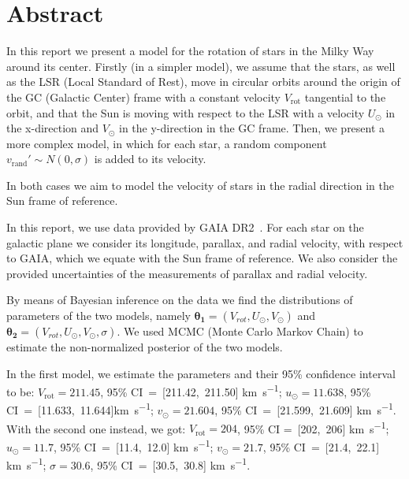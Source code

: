 \section*{Abstract}

In this report we present a model for the rotation of stars in the Milky Way around its center.
Firstly (in a simpler model), we assume that the stars, as well as the LSR (Local Standard of Rest), 
move in circular orbits around the origin of the GC (Galactic Center) frame 
with a constant velocity $V_{\text{rot}}$ tangential to the orbit,
and that the Sun is moving with respect to the LSR 
with a velocity $U_{\odot}$ in the x-direction and $V_{\odot}$ in the y-direction in the GC frame. 
Then, we present a more complex model, in which for each star, 
a random component $v_{\text{rand}}' \sim N(0, \sigma)$ is added to its velocity.


In both cases we aim to model the velocity of stars in the radial direction 
in the Sun frame of reference.

In this report, we use data provided by GAIA DR2~\cite{GAIADR2}.
For each star on the galactic plane we consider its longitude, parallax, and radial velocity,
with respect to GAIA, which we equate with the Sun frame of reference.
We also consider the provided uncertainties of the measurements of parallax and radial velocity.

By means of Bayesian inference on the data we find the distributions 
of parameters of the two models, 
namely $\mathbf{\theta_1} = (V_{rot}, U_{\odot}, V_{\odot})$ 
and $\mathbf{\theta_2} = (V_{rot}, U_{\odot}, V_{\odot}, \sigma)$.
We used MCMC (Monte Carlo Markov Chain) 
to estimate the non-normalized posterior of the two models. 

In the first model, we estimate the parameters and their 95\% confidence interval to be: 
$V_{\text{rot}} = 211.45$, 95\% CI~=~[211.42,~211.50] \unit{\kilo\meter\per\second}; 
$u_{\odot} = 11.638$, 95\% CI~=~[11.633,~11.644]\unit{\kilo\meter\per\second}; 
$v_{\odot} = 21.604$, 95\% CI~=~[21.599,~21.609] \unit{\kilo\meter\per\second}. 
With the second one instead, we got: 
$V_{\text{rot}}= 204$, 95\% CI =~[202,~206] \unit{\kilo\meter\per\second}; 
$u_{\odot} = 11.7$, 95\% CI~=~[11.4,~12.0] \unit{\kilo\meter\per\second}; 
$v_{\odot} = 21.7$, 95\% CI~=~[21.4,~22.1] \unit{\kilo\meter\per\second}; 
$\sigma = 30.6$, 95\% CI~=~[30.5,~30.8] \unit{\kilo\meter\per\second}.
